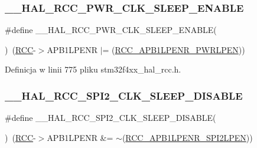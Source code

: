 \subsubsection{\texorpdfstring{\+\_\+\+\_\+\+H\+A\+L\+\_\+\+R\+C\+C\+\_\+\+P\+W\+R\+\_\+\+C\+L\+K\+\_\+\+S\+L\+E\+E\+P\+\_\+\+E\+N\+A\+B\+LE}{\_\_HAL\_RCC\_PWR\_CLK\_SLEEP\_ENABLE}}
{\footnotesize\ttfamily \#define \+\_\+\+\_\+\+H\+A\+L\+\_\+\+R\+C\+C\+\_\+\+P\+W\+R\+\_\+\+C\+L\+K\+\_\+\+S\+L\+E\+E\+P\+\_\+\+E\+N\+A\+B\+LE(\begin{DoxyParamCaption}{ }\end{DoxyParamCaption})~(\hyperlink{group___peripheral__declaration_ga74944438a086975793d26ae48d5882d4}{R\+CC}-\/$>$A\+P\+B1\+L\+P\+E\+NR $\vert$= (\hyperlink{group___peripheral___registers___bits___definition_ga274fa282ad1ff40b747644bf9360feb4}{R\+C\+C\+\_\+\+A\+P\+B1\+L\+P\+E\+N\+R\+\_\+\+P\+W\+R\+L\+P\+EN}))}



Definicja w linii 775 pliku stm32f4xx\+\_\+hal\+\_\+rcc.\+h.

\mbox{\label{group___r_c_c___a_p_b1___low_power___enable___disable_ga4fff9b3416d2940cac20962e6d5655ec}} 
\subsubsection{\texorpdfstring{\+\_\+\+\_\+\+H\+A\+L\+\_\+\+R\+C\+C\+\_\+\+S\+P\+I2\+\_\+\+C\+L\+K\+\_\+\+S\+L\+E\+E\+P\+\_\+\+D\+I\+S\+A\+B\+LE}{\_\_HAL\_RCC\_SPI2\_CLK\_SLEEP\_DISABLE}}
{\footnotesize\ttfamily \#define \+\_\+\+\_\+\+H\+A\+L\+\_\+\+R\+C\+C\+\_\+\+S\+P\+I2\+\_\+\+C\+L\+K\+\_\+\+S\+L\+E\+E\+P\+\_\+\+D\+I\+S\+A\+B\+LE(\begin{DoxyParamCaption}{ }\end{DoxyParamCaption})~(\hyperlink{group___peripheral__declaration_ga74944438a086975793d26ae48d5882d4}{R\+CC}-\/$>$A\+P\+B1\+L\+P\+E\+NR \&= $\sim$(\hyperlink{group___peripheral___registers___bits___definition_ga41dcbf845448cbb1b75c0ad7e83b77cb}{R\+C\+C\+\_\+\+A\+P\+B1\+L\+P\+E\+N\+R\+\_\+\+S\+P\+I2\+L\+P\+EN}))}



